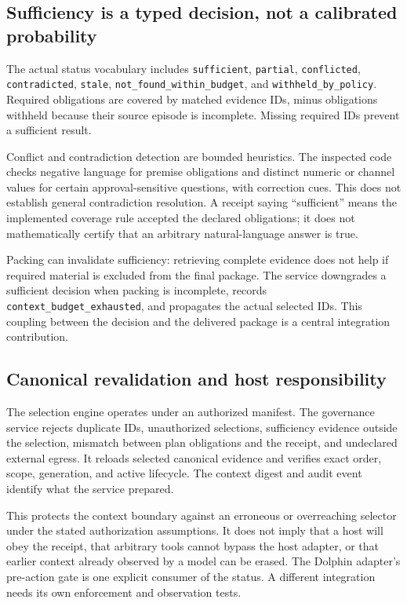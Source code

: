 \documentclass[11pt]{article}
\newcommand{\code}[1]{\texttt{\small #1}}
\begin{document}
\subsection{Sufficiency is a typed decision, not a calibrated probability}
The actual status vocabulary includes \code{sufficient}, \code{partial}, \code{conflicted}, \code{contradicted}, \code{stale}, \code{not\_found\_within\_budget}, and \code{withheld\_by\_policy}. Required obligations are covered by matched evidence IDs, minus obligations withheld because their source episode is incomplete. Missing required IDs prevent a sufficient result.

Conflict and contradiction detection are bounded heuristics. The inspected code checks negative language for premise obligations and distinct numeric or channel values for certain approval-sensitive questions, with correction cues. This does not establish general contradiction resolution. A receipt saying ``sufficient'' means the implemented coverage rule accepted the declared obligations; it does not mathematically certify that an arbitrary natural-language answer is true.

Packing can invalidate sufficiency: retrieving complete evidence does not help if required material is excluded from the final package. The service downgrades a sufficient decision when packing is incomplete, records \code{context\_budget\_exhausted}, and propagates the actual selected IDs. This coupling between the decision and the delivered package is a central integration contribution.

\subsection{Canonical revalidation and host responsibility}
The selection engine operates under an authorized manifest. The governance service rejects duplicate IDs, unauthorized selections, sufficiency evidence outside the selection, mismatch between plan obligations and the receipt, and undeclared external egress. It reloads selected canonical evidence and verifies exact order, scope, generation, and active lifecycle. The context digest and audit event identify what the service prepared.

This protects the context boundary against an erroneous or overreaching selector under the stated authorization assumptions. It does not imply that a host will obey the receipt, that arbitrary tools cannot bypass the host adapter, or that earlier context already observed by a model can be erased. The Dolphin adapter's pre-action gate is one explicit consumer of the status. A different integration needs its own enforcement and observation tests.
\end{document}
